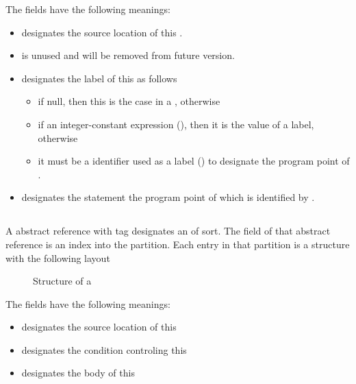 The fields have the following meanings:
\begin{itemize}
	\item {} designates the source location of this .
	\item {} is unused and will be removed from future version.
	\item {} designates the label of this  as follows
		\begin{itemize}
			\item if null, then this is the  case in a , otherwise
			\item if an integer-constant expression (), then it is the value of a  label, otherwise
			\item it must be a identifier used as a label () to designate the program point of .
		\end{itemize}
	\item {} designates the statement the program point of which is identified by .
\end{itemize}


\subsection{}
\label{sec:ifc:StmtSort:While}

A  abstract reference with tag  designates an  of  sort.
The  field of that abstract reference is an index into the  partition.
Each entry in that partition is a structure with the following layout
%
\begin{figure}[H]
	\centering
	\caption{Structure of a }
	\label{fig:ifc-while-stmt-structure}
\end{figure}
%
The fields have the following meanings:
\begin{itemize}
	\item {} designates the source location of this 
	\item {} designates the condition controling this 
	\item {} designates the body of this 
\end{itemize}

